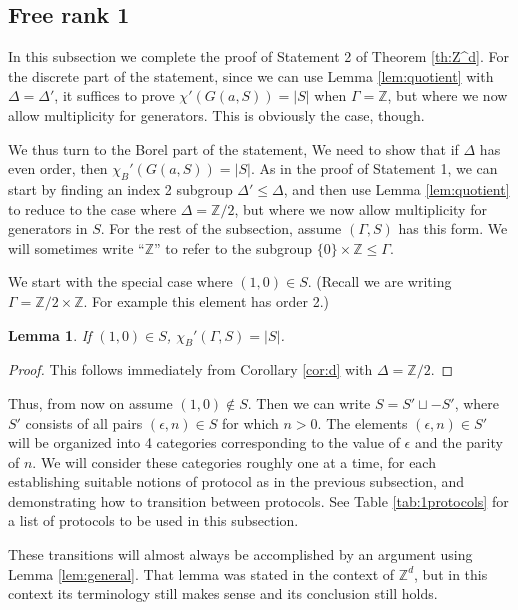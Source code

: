 \documentclass[10pt,a4paper]{article}
\newcommand{\0}{\varnothing}
\newcommand{\Z}{\mathbb{Z}}
\newtheorem{lemma}{Lemma}
\begin{document}
\subsection{Free rank 1}\label{subsec:1}

In this subsection we complete the proof of Statement 2 of Theorem \ref{th:Z^d}. For the discrete part of the statement, since we can use Lemma \ref{lem:quotient} with $\Delta = \Delta'$, it suffices to prove $\chi'(G(a,S)) = |S|$ when $\Gamma = \Z$, but where we now allow multiplicity for generators. This is obviously the case, though.

We thus turn to the Borel part of the statement, We need to show that if $\Delta$ has even order, then $\chi_B'(G(a,S)) = |S|$. As in the proof of Statement 1, we can start by finding an index 2 subgroup $\Delta' \leq \Delta$, and then use Lemma \ref{lem:quotient} to reduce to the case where $\Delta = \Z/2$, but where we now allow multiplicity for generators in $S$. For the rest of the subsection, assume $(\Gamma,S)$ has this form. We will sometimes write ``$\Z$'' to refer to the subgroup $\{0\} \times \Z \leq \Gamma$.

We start with the special case where $(1,0) \in S$. (Recall we are writing $\Gamma = \Z/2 \times \Z$. For example this element has order 2.)

\begin{lemma}\label{lem:(1,0)}
If $(1,0) \in S$, $\chi_B'(\Gamma,S) = |S|$.
\end{lemma}

\begin{proof}
This follows immediately from Corollary \ref{cor:d} with $\Delta = \Z/2$.
\end{proof}

Thus, from now on assume $(1,0) \not\in S$. Then we can write $S = S' \sqcup -S'$, where $S'$ consists of all pairs $(\epsilon,n) \in S$ for which $n > 0$. The elements $(\epsilon,n) \in S'$ will be organized into 4 categories corresponding to the value of $\epsilon$ and the parity of $n$. We will consider these categories roughly one at a time, for each establishing suitable notions of protocol as in the previous subsection, and demonstrating how to transition between protocols. See Table \ref{tab:1protocols} for a list of protocols to be used in this subsection.

These transitions will almost always be accomplished by an argument using Lemma \ref{lem:general}. That lemma was stated in the context of $\Z^d$, but in this context its terminology still makes sense and its conclusion still holds.
\end{document}
